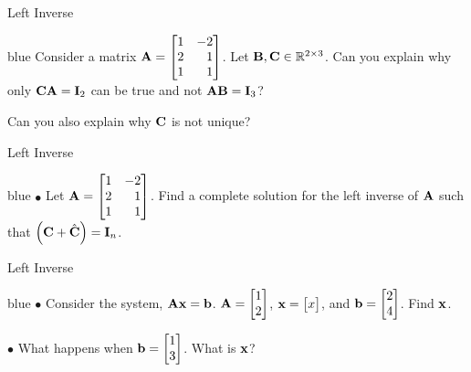\documentclass[aspectratio=169]{beamer}
\def\mf{\ensuremath\mathbf}
\def\mb{\ensuremath\mathbb}
\def\lp{\ensuremath\left(}
\def\rp{\ensuremath\right)}
\begin{document}
\begin{frame}[t]{Left Inverse}
\begin{color}{blue}
    Consider a matrix $\mf{A} = \begin{bmatrix*}[r]1 & -2\\2 & 1\\1 & 1\end{bmatrix*}$. Let $\mf{B}, \mf{C}  \in \mb{R}^{2 \times 3}$. Can you explain why only $\mf{CA} = \mf{I}_2$ can be true and not $\mf{AB} = \mf{I}_3$?\\ \vspace{2cm}


    Can you also explain why $\mf{C}$ is not unique?
\end{color}
\end{frame}

\begin{frame}[t]{Left Inverse}
\begin{color}{blue}
    $\bullet$ Let $\mf{A} = \begin{bmatrix*}[r]1 & -2\\2 & 1\\1 & 1\end{bmatrix*}$. Find a complete solution for the left inverse of $\mf{A}$ such that $\lp\mf{C} + \hat{\mf{C}}\rp = \mf{I}_n$.\\
    \vspace{2cm}
\end{color}
\end{frame}

\begin{frame}[t]{Left Inverse}
\begin{color}{blue}
    $\bullet$ Consider the system, $\mf{Ax} = \mf{b}$. $\mf{A} = \begin{bmatrix*}[r]1\\2\end{bmatrix*}$, $\mf{x} = \begin{bmatrix*}x\end{bmatrix*}$, and $\mf{b} = \begin{bmatrix*}2\\4\end{bmatrix*}$. Find $\mf{x}$.\\
    \vspace{2cm}
    
    $\bullet$ What happens when $\mf{b} = \begin{bmatrix*}1\\3\end{bmatrix*}$. What is $\mf{x}$?
\end{color}
\end{frame}
\end{document}
